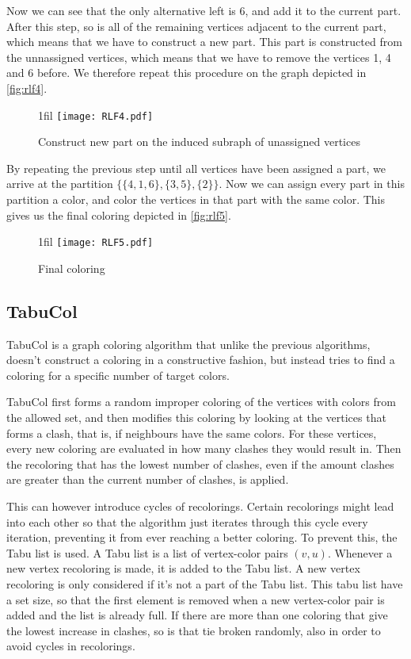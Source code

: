 \documentclass[a4paper]{article}
\makeatletter
\newcommand*{\centerfloat}{%
  \parindent \z@
  \leftskip \z@ \@plus 1fil \@minus \textwidth
  \rightskip\leftskip
  \parfillskip \z@skip}
\makeatother
\begin{document}
Now we can see that the only alternative left is 6, and add it to the current
part. After this step, so is all of the remaining vertices adjacent to the
current part, which means that we have to construct a new part. This part is
constructed from the unnassigned vertices, which means that we have to remove
the vertices  1, 4 and 6 before. We therefore repeat this procedure on the graph 
depicted in \autoref{fig:rlf4}.

\begin{figure}[H]
    \centerfloat
    \texttt{[image: RLF4.pdf]}
    \caption{Construct new part on the induced subraph of unassigned vertices}
    \label{fig:rlf4}
\end{figure}

By repeating the previous step until all vertices have been assigned a part, we 
arrive at the partition $\{\{4,1,6\},\{3,5\},\{2\}\}$. Now we can assign every
part in this partition a color, and color the vertices in that part with the same color. 
This gives us the final coloring depicted in \autoref{fig:rlf5}.

\begin{figure}[H]
    \centerfloat
    \texttt{[image: RLF5.pdf]}
    \caption{Final coloring}
    \label{fig:rlf5}
\end{figure}



\subsection{TabuCol}

TabuCol is a graph coloring algorithm that unlike the previous algorithms, doesn't
construct a coloring in a constructive fashion, but instead tries to find a
coloring for a specific number of target colors.

TabuCol first forms a random improper coloring of the vertices with colors from
the allowed set, and then modifies this coloring by looking at the vertices that
forms a clash, that is, if neighbours have the same colors. For these vertices,
every new coloring are evaluated in how many clashes they would result in. 
Then the recoloring that has the lowest number of clashes, even if the amount
clashes are greater than the current number of clashes, is applied.

This can however introduce cycles of recolorings. Certain recolorings might
lead into each other so that the algorithm just iterates through this cycle
every iteration, preventing it from ever reaching a better coloring. To prevent
this, the Tabu list is used. A Tabu list is a list of vertex-color pairs
$(v,u)$. Whenever a new vertex recoloring is made, it is added to the Tabu
list. A new vertex recoloring is only considered if it's not a part of the Tabu
list. This tabu list have a set size, so that the first element is removed when
a new vertex-color pair is added and the list is already full. If there are more than one coloring that give
the lowest increase in clashes, so is that tie broken randomly, also in order
to avoid cycles in recolorings.
\end{document}
